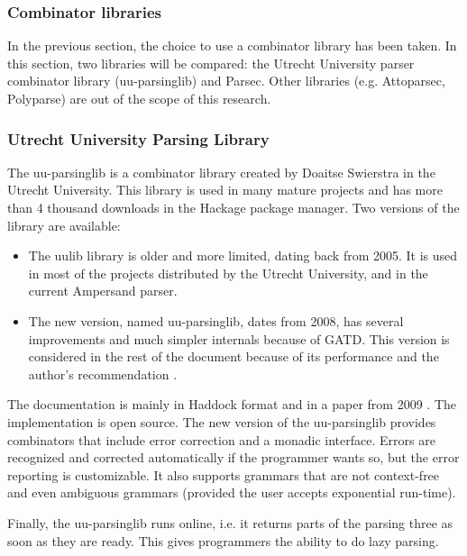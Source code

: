 \subsubsection{Combinator libraries}
In the previous section, the choice to use a combinator library has been taken.
In this section, two libraries will be compared: the Utrecht University parser combinator library (uu-parsinglib) and Parsec.
Other libraries (e.g. Attoparsec, Polyparse) are out of the scope of this research.

\subsubsection{Utrecht University Parsing Library}
%
%
%
The uu-parsinglib is a combinator library created by Doaitse Swierstra in the Utrecht University.
This library is used in many mature projects and has more than 4 thousand downloads in the Hackage package manager.
Two versions of the library are available:
\begin{itemize}
  \item The uulib library is older and more limited, dating back from 2005.
    It is used in most of the projects distributed by the Utrecht University, and in the current Ampersand parser.
  \item The new version, named uu-parsinglib, dates from 2008, has several improvements and much simpler internals because of GATD.
    This version is considered in the rest of the document because of its performance  and the author's recommendation .
\end{itemize}
%
The documentation is mainly in Haddock format and in a paper from 2009 .
The implementation is open source.
The new version of the uu-parsinglib provides combinators that include error correction and a monadic interface.
Errors are recognized and corrected automatically if the programmer wants so, but the error reporting is customizable.
It also supports grammars that are not context-free and even ambiguous grammars (provided the user accepts exponential run-time).

Finally, the uu-parsinglib runs online, i.e. it returns parts of the parsing three as soon as they are ready.
This gives programmers the ability to do lazy parsing.

